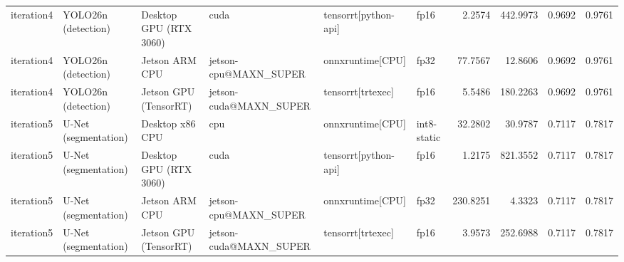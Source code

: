 \begin{table}
\begin{tabular}{llllllrrrr}
iteration4 & YOLO26n (detection) & Desktop GPU (RTX 3060) & cuda & tensorrt[python-api] & fp16 & 2.2574 & 442.9973 & 0.9692 & 0.9761 \\
iteration4 & YOLO26n (detection) & Jetson ARM CPU & jetson-cpu@MAXN\_SUPER & onnxruntime[CPU] & fp32 & 77.7567 & 12.8606 & 0.9692 & 0.9761 \\
iteration4 & YOLO26n (detection) & Jetson GPU (TensorRT) & jetson-cuda@MAXN\_SUPER & tensorrt[trtexec] & fp16 & 5.5486 & 180.2263 & 0.9692 & 0.9761 \\
iteration5 & U-Net (segmentation) & Desktop x86 CPU & cpu & onnxruntime[CPU] & int8-static & 32.2802 & 30.9787 & 0.7117 & 0.7817 \\
iteration5 & U-Net (segmentation) & Desktop GPU (RTX 3060) & cuda & tensorrt[python-api] & fp16 & 1.2175 & 821.3552 & 0.7117 & 0.7817 \\
iteration5 & U-Net (segmentation) & Jetson ARM CPU & jetson-cpu@MAXN\_SUPER & onnxruntime[CPU] & fp32 & 230.8251 & 4.3323 & 0.7117 & 0.7817 \\
iteration5 & U-Net (segmentation) & Jetson GPU (TensorRT) & jetson-cuda@MAXN\_SUPER & tensorrt[trtexec] & fp16 & 3.9573 & 252.6988 & 0.7117 & 0.7817 \\
\bottomrule
\end{tabular}
\end{table}
